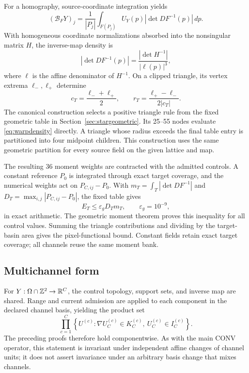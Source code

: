 For a homography, source-coordinate integration yields
\begin{equation}
 (\mathcal B_FY)_j=\frac1{|P_j|}
 \int_{F(P_j)}U_Y(p)\left|\det DF^{-1}(p)\right|\,dp.
 \label{eq:warpprojectiveintegral}
\end{equation}
With homogeneous coordinate normalizations absorbed into the nonsingular
matrix \(H\), the inverse-map density is
\begin{equation}
 \left|\det DF^{-1}(p)\right|
 =\frac{|\det H^{-1}|}{|\ell(p)|^3},
 \label{eq:warpdensity}
\end{equation}
where \(\ell\) is the affine denominator of \(H^{-1}\). On a clipped
triangle, its vertex extrema \(\ell_-,\ell_+\) determine
\begin{equation}
 c_T=\frac{\ell_-+\ell_+}{2},\qquad
 r_T=\frac{\ell_+-\ell_-}{2|c_T|}.
\end{equation}
The canonical construction selects a positive triangle rule from the fixed
geometric table in Section~\ref{sec:stargeometric}. Its 25--55 nodes evaluate
\eqref{eq:warpdensity} directly. A triangle whose radius exceeds the final
table entry is partitioned into four midpoint children. This construction
uses the same geometric partition for every source field on the given
lattice and map.

The resulting 36 moment weights are contracted with the admitted controls.
A constant reference \(P_0\) is integrated through exact target coverage,
and the numerical weights act on \(P_{C,ij}-P_0\). With
\(m_T=\int_T|\det DF^{-1}|\) and
\(D_T=\max_{i,j}|P_{C,ij}-P_0|\), the fixed table gives
\begin{equation}
 E_T\leq \varepsilon_gD_Tm_T,\qquad \varepsilon_g=10^{-9},
 \label{eq:warpprojectivecertificate}
\end{equation}
in exact arithmetic. The geometric moment theorem proves this inequality
for all control values. Summing the triangle contributions and dividing by
the target-basin area gives the pixel-functional bound. Constant fields
retain exact target coverage; all channels reuse the same moment bank.

\subsection{Multichannel form}

For \(Y:\Omega\cap\mathbb Z^2\to\mathbb{R}^C\), the control topology, support sets,
and inverse map are shared.  Range and current admission are applied to each
component in the declared channel basis, yielding the product set
\begin{equation}
 \prod_{c=1}^C
 \left\{U^{(c)}:\nabla U_C^{(c)}\in K_C^{(c)},\ 
 U_C^{(c)}\in I_C^{(c)}\right\}.
 \label{eq:warpmultichannel}
\end{equation}
The preceding proofs therefore hold componentwise.  As with the main CONV
operator, this statement is invariant under independent affine changes of
channel units; it does not assert invariance under an arbitrary basis change
that mixes channels.

